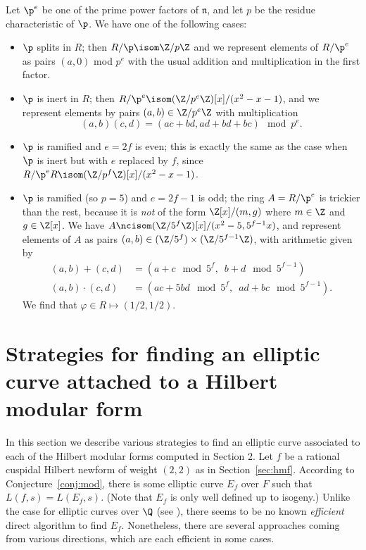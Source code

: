\documentclass{amsart}
\newcommand{\n}{\mathfrak{n}}
\begin{document}
Let $\p^e$ be one of the prime power factors of $\n$, and let $p$ be the residue
characteristic of $\p$. We have one of the following cases:
\begin{itemize}
\item $\p$ splits in $R$; then $R/\p\isom \Z/p\Z$ and we represent elements
of $R/\p^e$ as pairs $(a,0)$ mod $p^e$ with the usual addition and multiplication
in the first factor.
\item $\p$ is inert in $R$; then $R/\p^e\isom (\Z/p^e\Z)[x]/(x^2-x-1)$,
and we represent elements by pairs $(a,b) \in \Z/p^e\Z$ with multiplication
$$(a,b)(c,d) = (ac+bd,ad+bd+bc) \mod p^e.$$
\item $\p$ is ramified and $e=2f$ is even; this is exactly the
same as the case when $\p$ is inert but with $e$ replaced by $f$,
since $R/\p^eR \isom (\Z/p^{f}\Z)[x]/(x^2-x-1)$.
\item $\p$ is ramified (so $p=5$) and $e=2f-1$ is odd; the ring $A=R/\p^e$
  is trickier than the rest, because it is {\em not} of the form
  $\Z[x]/(m,g)$ where $m\in\Z$ and $g \in\Z[x]$.  We have $A \ncisom
  (\Z/5^f\Z)[x]/(x^2-5, 5^{f-1}x)$, and represent elements of $A$ as
  pairs $(a,b) \in (\Z/5^f)\times (\Z/5^{f-1}\Z)$, with arithmetic
  given by
\begin{align*}
(a,b) + (c,d) &= (a+c \mod 5^f,\,\,\, b+d \mod 5^{f-1})\\
(a,b)\cdot (c,d) &= (ac+5bd \mod 5^f,\,\,\, ad+bc \mod 5^{f-1}).
\end{align*}
 We find that $ \varphi \in R \mapsto (1/2,1/2)$.
\end{itemize}



\section{Strategies for finding an elliptic curve attached to a Hilbert modular form}\label{sec:finding}
In this section we describe various strategies to find an elliptic curve
 associated to each of the Hilbert modular forms computed in Section 2.
Let $f$ be a rational cuspidal Hilbert newform of weight $(2,2)$ as
in Section~\ref{sec:hmf}.  According to Conjecture~\ref{conj:mod},
there is some elliptic curve $E_f$ over $F$ such that $L(f,s) =
L(E_f,s)$.  (Note that $E_f$ is only well defined up to isogeny.)
Unlike the case for elliptic curves over $\Q$ (see \cite{cremona:algs}), 
there seems to be no known {\em efficient} direct algorithm to find $E_f$.
 Nonetheless, there are several approaches coming from various directions, 
which are each efficient in some cases.
\end{document}
